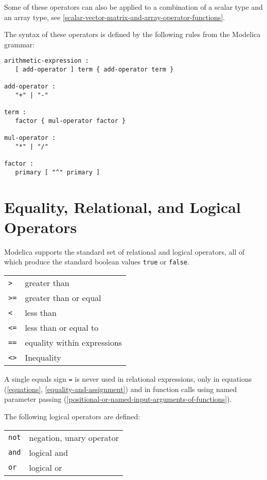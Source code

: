 Some of these operators can also be applied to a combination of a scalar
type and an array type, see \cref{scalar-vector-matrix-and-array-operator-functions}.

The syntax of these operators is defined by the following rules from the
Modelica grammar:
\begin{lstlisting}[language=grammar]
arithmetic-expression :
   [ add-operator ] term { add-operator term }

add-operator :
   "+" | "-"

term :
   factor { mul-operator factor }

mul-operator :
   "*" | "/"

factor :
   primary [ "^" primary ]
\end{lstlisting}

\section{Equality, Relational, and Logical Operators}\label{equality-relational-and-logical-operators}

Modelica supports the standard set of relational and logical operators,
all of which produce the standard boolean values \lstinline!true! or \lstinline!false!.


\begin{longtable}[]{ll}
\lstinline!>! & greater than\\
\lstinline!>=! & greater than or equal\\
\lstinline!<! & less than\\
\lstinline!<=! & less than or equal to\\
\lstinline!==! & equality within expressions\\
\lstinline!<>! & Inequality\\
\end{longtable}

A single equals sign \lstinline!=! is never used in relational expressions, only in
equations (\cref{equations}, \cref{equality-and-assignment}) and in function calls using named
parameter passing (\cref{positional-or-named-input-arguments-of-functions}).

The following logical operators are defined:
\begin{longtable}[]{ll}
\lstinline!not! & negation, unary operator\\
\lstinline!and! & logical and\\
\lstinline!or! & logical or\\
\end{longtable}

